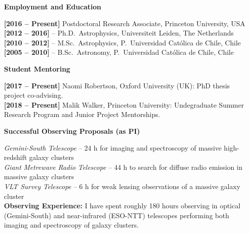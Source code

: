 \documentclass[11pt]{article}
\newcommand\technical[2]{
  \noindent
    {\large\bf #1:} #2\\
  }
\newcommand\sectitle[1]{
  \vspace{0.5cm}
  \noindent
  \textbf{\large #1}\\
  \vspace{-0.2cm}
}
\newcommand\itemdates[2]{\textbf{[#1 -- #2]}}
\begin{document}
\vspace{-0.5cm}
\sectitle{Employment and Education}

\noindent
\itemdates{2016}{Present} Postdoctoral Research Associate, Princeton University, USA\\
\itemdates{2012}{2016} -- Ph.D.~Astrophysics, Universiteit Leiden, The Netherlands\\
\itemdates{2010}{2012} -- M.Sc.~Astrophysics, P.~Universidad Cat\'olica de Chile, Chile\\
\itemdates{2005}{2010} -- B.Sc.~Astronomy, P.~Universidad Cat\'olica de Chile, Chile




\sectitle{Student Mentoring}

\noindent
\itemdates{2017}{Present} Naomi Robertson, Oxford University (UK): PhD thesis project co-advising.\\
\itemdates{2018}{Present} Malik Walker, Princeton University: Undegraduate Summer Research Program and Junior Project Mentorships.

\sectitle{Successful Observing Proposals (as PI)}

\noindent
\emph{Gemini-South Telescope} -- 24 h for imaging and spectroscopy of massive 
high-redshift galaxy clusters\\
\emph{Giant Metrewave Radio Telescope} -- 44 h to search for diffuse radio 
emission in massive galaxy clusters\\
\emph{VLT Survey Telescope} -- 6 h for weak lensing observations of a massive 
galaxy cluster\\


\technical{Observing Experience}
{I have spent roughly 180 hours observing in 
optical (Gemini-South) and near-infrared (ESO-NTT) telescopes performing both 
imaging and spectroscopy of galaxy clusters.}\\
\end{document}
